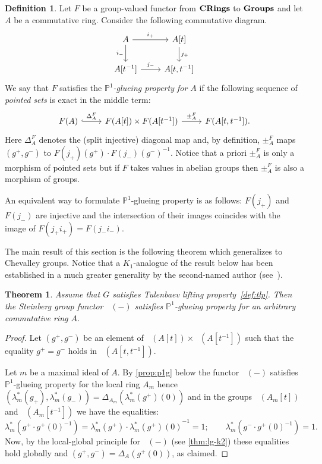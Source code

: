 \documentclass[oneside,12pt]{amsart}
\newtheorem{thm}{Theorem}
\numberwithin{equation}{section}
\numberwithin{lem}{section}
\theoremstyle{definition}
\newtheorem{dfn}[lem]{Definition}
\theoremstyle{remark}
\DeclareMathOperator{\St}{St^G}
\newcommand{\catname}[1]{{\normalfont\textbf{#1}}}
\newcommand{\Pro}{\mathbb{P}}
\begin{document}
\begin{dfn} \label{def:p1g} Let $F$ be a group-valued functor from $\catname{CRings}$ to $\catname{Groups}$ and let $A$ be a commutative ring.
Consider the following commutative diagram.
\[ \begin{tikzcd} A \ar[r, "i_+"] \ar[d, "i_-"'] & A[t] \ar[d, "j_+"] \\ A[t^{-1}] \ar[r, "j_-"] & A[t, t^{-1}] \end{tikzcd} \]
We say that $F$ satisfies the \emph{$\Pro^1$-glueing property for $A$} if the following sequence of \emph{pointed sets} is exact in the middle term:
\[ \begin{tikzcd} F(A) \ar[r, hookrightarrow, "\Delta_A^F"] & F(A[t]) \times F(A[t^{-1}]) \ar[r, "\pm_A^F"] & F(A[t, t^{-1}]). \end{tikzcd} \]
Here $\Delta^F_A$ denotes the (split injective) diagonal map and, by definition, $\pm_A^F$ maps $(g^+, g^-)$ to $F(j_+)(g^+) \cdot F(j_-)(g^-)^{-1}.$
Notice that a priori $\pm_A^F$ is only a morphism of pointed sets but if $F$ takes values in abelian groups then $\pm_A^F$ is also a morphism of groups. 

An equivalent way to formulate $\Pro^1$-glueing property is as follows: 
$F(j_+)$ and $F(j_-)$ are injective and the intersection of their images coincides with the image of $F(j_+ i_+) = F(j_- i_-).$ \end{dfn}

The main result of this section is the following theorem which generalizes \cite[Theorem~5.1]{Tu} to Chevalley groups.
Notice that a $K_1$-analogue of the result below has been established in a much greater generality by the second-named author (see~\cite[Theorem~1.1]{St-poly}).
\begin{thm} \label{thm:p1} Assume that $G$ satisfies Tulenbaev lifting property~\ref{def:tlp}.
Then the Steinberg group functor $\St(-)$ satisfies $\Pro^1$-glueing property for an arbitrary commutative ring $A$. \end{thm}
\begin{proof}
 Let $(g^+, g^-)$ be an element of $\St(A[t]) \times \St(A[t^{-1}])$ such that the equality $g^+ = g^-$ holds in $\St(A[t, t^{-1}])$.
 
 Let $m$ be a maximal ideal of $A$.
 By \cref{prop:p1g} below the functor $\St(-)$ satisfies $\Pro^1$-glueing property for the local ring $A_m$ hence 
 $(\lambda_m^*(g_+), \lambda_m^*(g_-)) = \Delta_{A_m}(\lambda_m^*(g^+)(0))$ and in the groups $\St(A_m[t])$ and $\St(A_m[t^{-1}])$ we have the equalities:
 $$\lambda_m^*(g^+ \cdot g^+(0)^{-1}) = \lambda_m^*(g^+) \cdot {\lambda_m^*(g^+)(0)}^{-1} = 1; \qquad \lambda_m^*(g^-\cdot g^+(0)^{-1}) =1. $$
 Now, by the local-global principle for $\St(-)$ (see \cref{thm:lg-k2}) these equalities hold globally and $(g^+, g^-) = \Delta_A(g^+(0))$, as claimed. 
\end{proof}
\end{document}
